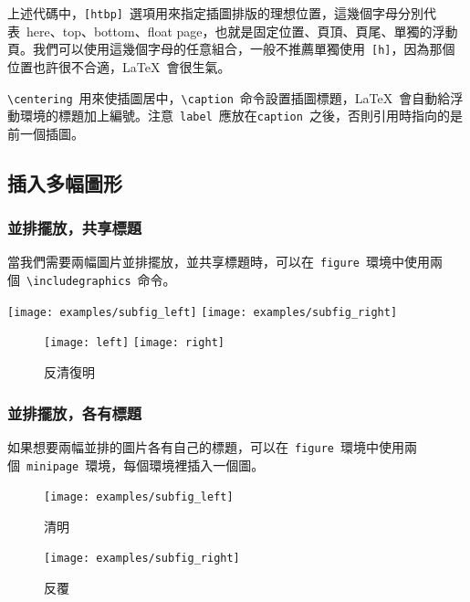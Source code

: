 上述代碼中，\verb|[htbp]|~選項用來指定插圖排版的理想位置，這幾個字母分別代表~here、top、bottom、float page，也就是固定位置、頁頂、頁尾、單獨的浮動頁。我們可以使用這幾個字母的任意組合，一般不推薦單獨使用~\verb|[h]|，因為那個位置也許很不合適，\LaTeX~會很生氣。

\verb|\centering|~用來使插圖居中，\verb|\caption|~命令設置插圖標題，\LaTeX~會自動給浮動環境的標題加上編號。注意~\verb|label|~應放在\verb|caption|~之後，否則引用時指向的是前一個插圖。

\subsection{插入多幅圖形}
\subsubsection{並排擺放，共享標題}
當我們需要兩幅圖片並排擺放，並共享標題時，可以在~\verb|figure|~環境中使用兩個~\verb|\includegraphics|~命令。

\begin{fdemo}{
\centering
\texttt{[image: examples/subfig\_left]}
\texttt{[image: examples/subfig\_right]}
}
\begin{figure}[htbp]
\centering
\texttt{[image: left]}
\texttt{[image: right]}
\caption{反清復明}
\end{figure}
\end{fdemo}

\subsubsection{並排擺放，各有標題}
如果想要兩幅並排的圖片各有自己的標題，可以在~\verb|figure|~環境中使用兩個~\verb|minipage|~環境，每個環境裡插入一個圖。

\begin{figure}[htbp]
\centering
\begin{minipage}[t]{0.3\textwidth}
    \centering
    \texttt{[image: examples/subfig\_left]}
    \caption{清明}
\end{minipage}
\begin{minipage}[t]{0.3\textwidth}
    \centering
    \texttt{[image: examples/subfig\_right]}
    \caption{反覆}
\end{minipage}
\end{figure}

